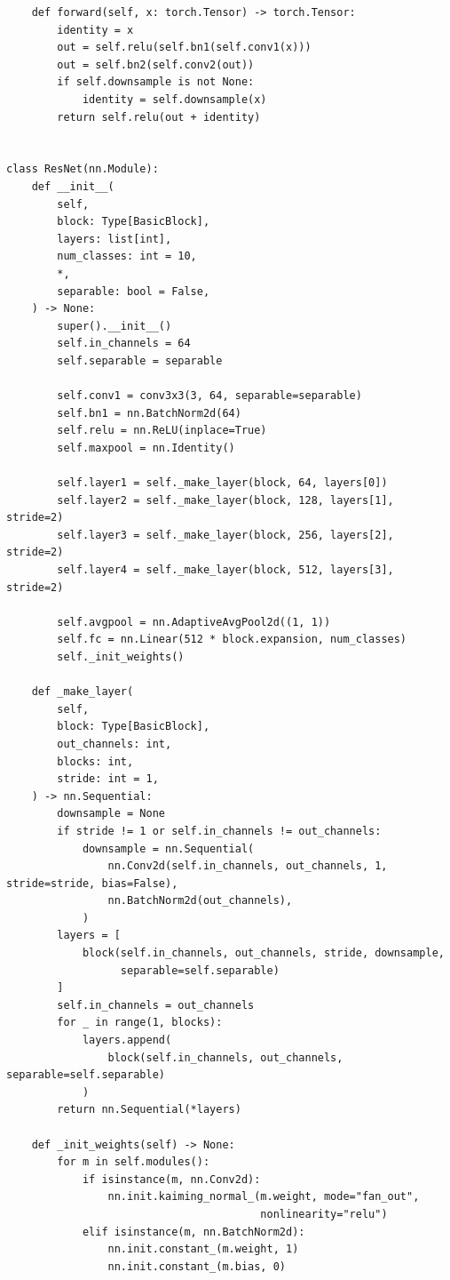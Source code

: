 \begin{verbatim}
    def forward(self, x: torch.Tensor) -> torch.Tensor:
        identity = x
        out = self.relu(self.bn1(self.conv1(x)))
        out = self.bn2(self.conv2(out))
        if self.downsample is not None:
            identity = self.downsample(x)
        return self.relu(out + identity)


class ResNet(nn.Module):
    def __init__(
        self,
        block: Type[BasicBlock],
        layers: list[int],
        num_classes: int = 10,
        *,
        separable: bool = False,
    ) -> None:
        super().__init__()
        self.in_channels = 64
        self.separable = separable

        self.conv1 = conv3x3(3, 64, separable=separable)
        self.bn1 = nn.BatchNorm2d(64)
        self.relu = nn.ReLU(inplace=True)
        self.maxpool = nn.Identity()

        self.layer1 = self._make_layer(block, 64, layers[0])
        self.layer2 = self._make_layer(block, 128, layers[1], stride=2)
        self.layer3 = self._make_layer(block, 256, layers[2], stride=2)
        self.layer4 = self._make_layer(block, 512, layers[3], stride=2)

        self.avgpool = nn.AdaptiveAvgPool2d((1, 1))
        self.fc = nn.Linear(512 * block.expansion, num_classes)
        self._init_weights()

    def _make_layer(
        self,
        block: Type[BasicBlock],
        out_channels: int,
        blocks: int,
        stride: int = 1,
    ) -> nn.Sequential:
        downsample = None
        if stride != 1 or self.in_channels != out_channels:
            downsample = nn.Sequential(
                nn.Conv2d(self.in_channels, out_channels, 1, stride=stride, bias=False),
                nn.BatchNorm2d(out_channels),
            )
        layers = [
            block(self.in_channels, out_channels, stride, downsample,
                  separable=self.separable)
        ]
        self.in_channels = out_channels
        for _ in range(1, blocks):
            layers.append(
                block(self.in_channels, out_channels, separable=self.separable)
            )
        return nn.Sequential(*layers)

    def _init_weights(self) -> None:
        for m in self.modules():
            if isinstance(m, nn.Conv2d):
                nn.init.kaiming_normal_(m.weight, mode="fan_out",
                                        nonlinearity="relu")
            elif isinstance(m, nn.BatchNorm2d):
                nn.init.constant_(m.weight, 1)
                nn.init.constant_(m.bias, 0)


\end{verbatim}
